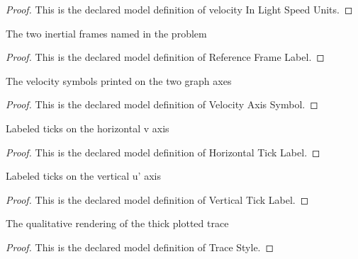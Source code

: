 \begin{proof}
  This is the declared model definition of velocity In Light Speed Units.
\end{proof}
\begin{definition}
  \label{def:physics:phyx-mini-0595:phyxminiproblems-problemphyxmini0595-referenceframelabel}
  The two inertial frames named in the problem
\end{definition}
\begin{proof}
  This is the declared model definition of Reference Frame Label.
\end{proof}
\begin{definition}
  \label{def:physics:phyx-mini-0595:phyxminiproblems-problemphyxmini0595-velocityaxissymbol}
  The velocity symbols printed on the two graph axes
\end{definition}
\begin{proof}
  This is the declared model definition of Velocity Axis Symbol.
\end{proof}
\begin{definition}
  \label{def:physics:phyx-mini-0595:phyxminiproblems-problemphyxmini0595-horizontalticklabel}
  Labeled ticks on the horizontal v axis
\end{definition}
\begin{proof}
  This is the declared model definition of Horizontal Tick Label.
\end{proof}
\begin{definition}
  \label{def:physics:phyx-mini-0595:phyxminiproblems-problemphyxmini0595-verticalticklabel}
  Labeled ticks on the vertical u' axis
\end{definition}
\begin{proof}
  This is the declared model definition of Vertical Tick Label.
\end{proof}
\begin{definition}
  \label{def:physics:phyx-mini-0595:phyxminiproblems-problemphyxmini0595-tracestyle}
  The qualitative rendering of the thick plotted trace
\end{definition}
\begin{proof}
  This is the declared model definition of Trace Style.
\end{proof}
